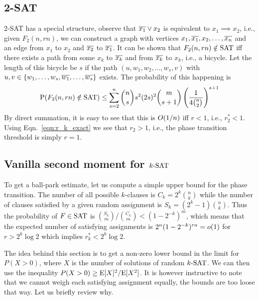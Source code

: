 \documentclass[letterpaper, 10pt, twocolumn, reqno]{amsart}
\begin{document}
\subsection{2-SAT}
\label{ssec:2sat}
2-SAT has a special structure, observe that $\overline{x_1} \vee x_2$ is equivalent to $x_1 \implies x_2$, i.e., given $F_2(n, rn)$, we can construct a graph with
vertices $x_1, \overline{x_1}, x_2, \ldots, \overline{x_n}$ and an edge from $x_1$ to $x_2$ and $\overline{x_2}$ to $\overline{x_1}$. It can be shown that $F_2(n,rn) \notin \textrm{SAT}$ iff
there exists a path from some $x_k$ to $\overline{x_k}$ and from $\overline{x_k}$ to $x_k$, i.e., a bicycle. Let the length of this bicycle be $s$ if the path $(u, w_1, w_2
, \ldots, w_s, v)$ with $u,v \in \{w_1, \ldots, w_s,\overline{w_1}, \ldots, \overline{w_s}\}$
 exists. The probability of this happening is
$$
\textrm{P}(F_2(n,rn) \notin \textrm{SAT}) \leq \sum_{s=2}^n {n \choose s} s^2 (2s)^2 {m \choose s+1} \left(\frac{1}{4 {n \choose 2}}\right)^{s+1}
$$
By direct summation, it is easy to see that this is $O(1/n)$ iff $r <1$, i.e., $r_2^* < 1$. Using Eqn.~\eqref{eqn:r_k_exact} we see that $r_2 > 1$, i.e., the phase transition threshold is simply $r = 1$.

\subsection{Vanilla second moment for $k\textrm{-SAT}$}
\label{ssec:ksat_vanilla}
To get a ball-park estimate, let us compute a simple upper bound for the phase transition. The number of all possible $k$-clauses is $C_k = 2^k {n \choose k}$ while the number of clauses satisfied by a given random assignment is $S_k = (2^k -1) {n \choose k}$. Thus the probability of $F \in \textrm{SAT}$ is ${S_k \choose m}/{C_k \choose m} < (1-2^{-k})^m$, which means that the expected number of satisfying assignments is $2^n (1-2^{-k})^{rn} = o(1)$ for $r > 2^k \log 2$ which implies $r_k^* < 2^k \log 2$.

The idea behind this section is to get a non-zero lower bound in the limit for $P(X > 0)$, where $X$ is the number of solutions of random $k\textrm{-SAT}$. We can then use the inequality $P(X>0) \geq \textrm{E}[X]^2/\textrm{E}[X^2]$. It is however instructive to note that we cannot weigh each satisfying assignment equally, the bounds are too loose that way. Let us briefly review why.
\end{document}
